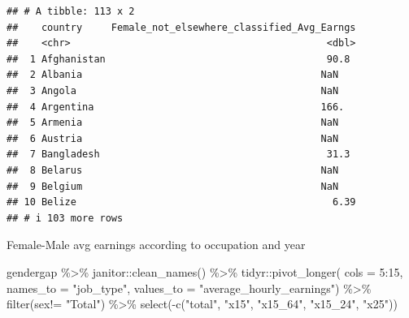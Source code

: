 \documentclass[
]{article}
\newenvironment{Shaded}{\begin{snugshade}}{\end{snugshade}}
\newcommand{\AttributeTok}[1]{\textcolor[rgb]{0.77,0.63,0.00}{#1}}
\newcommand{\DecValTok}[1]{\textcolor[rgb]{0.00,0.00,0.81}{#1}}
\newcommand{\FunctionTok}[1]{\textcolor[rgb]{0.00,0.00,0.00}{#1}}
\newcommand{\NormalTok}[1]{#1}
\newcommand{\SpecialCharTok}[1]{\textcolor[rgb]{0.00,0.00,0.00}{#1}}
\newcommand{\StringTok}[1]{\textcolor[rgb]{0.31,0.60,0.02}{#1}}
\begin{document}
\begin{verbatim}
## # A tibble: 113 x 2
##    country     Female_not_elsewhere_classified_Avg_Earngs
##    <chr>                                            <dbl>
##  1 Afghanistan                                      90.8 
##  2 Albania                                         NaN   
##  3 Angola                                          NaN   
##  4 Argentina                                       166.  
##  5 Armenia                                         NaN   
##  6 Austria                                         NaN   
##  7 Bangladesh                                       31.3 
##  8 Belarus                                         NaN   
##  9 Belgium                                         NaN   
## 10 Belize                                            6.39
## # i 103 more rows
\end{verbatim}

Female-Male avg earnings according to occupation and year

\begin{Shaded}
\begin{Highlighting}[]
\NormalTok{gendergap }\SpecialCharTok{\%\textgreater{}\%}
\NormalTok{  janitor}\SpecialCharTok{::}\FunctionTok{clean\_names}\NormalTok{() }\SpecialCharTok{\%\textgreater{}\%}
\NormalTok{tidyr}\SpecialCharTok{::}\FunctionTok{pivot\_longer}\NormalTok{( }\AttributeTok{cols =} \DecValTok{5}\SpecialCharTok{:}\DecValTok{15}\NormalTok{,}
             \AttributeTok{names\_to =} \StringTok{"job\_type"}\NormalTok{,}
             \AttributeTok{values\_to =} \StringTok{"average\_hourly\_earnings"}\NormalTok{) }\SpecialCharTok{\%\textgreater{}\%}
\FunctionTok{filter}\NormalTok{(sex}\SpecialCharTok{!=} \StringTok{"Total"}\NormalTok{) }\SpecialCharTok{\%\textgreater{}\%}
\FunctionTok{select}\NormalTok{(}\SpecialCharTok{{-}}\FunctionTok{c}\NormalTok{(}\StringTok{"total"}\NormalTok{, }\StringTok{"x15"}\NormalTok{, }\StringTok{"x15\_64"}\NormalTok{, }\StringTok{"x15\_24"}\NormalTok{, }\StringTok{"x25"}\NormalTok{))}
\end{Highlighting}
\end{Shaded}
\end{document}
